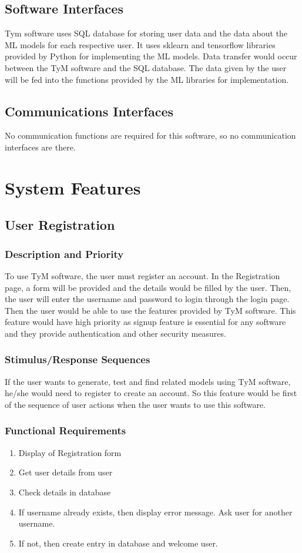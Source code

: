 \documentclass{scrreprt}
\begin{document}
\section{Software Interfaces}
Tym software uses SQL database for storing user data and the data about the ML models for each respective user. It uses sklearn and tensorflow libraries provided by Python for implementing the ML models. Data transfer would occur between the TyM software and the SQL database. The data given by the user will be fed into the functions provided by the ML libraries for implementation. 

\section{Communications Interfaces}
No communication functions are required for this software, so no communication interfaces are there.


\chapter{System Features}


\section{User Registration}

\subsection{Description and Priority}
To use TyM software, the user must register an account. In the Registration page, a form will be provided and the details would be filled by the user. Then, the user will enter the username and password to login through the login page. Then the user would be able to use the features provided by TyM software. This feature would have high priority as signup feature is essential for any software and they provide authentication and other security measures.

\subsection{Stimulus/Response Sequences}
If the user wants to generate, test and find related models using TyM software, he/she would need to register to create an account. So this feature would be first of the sequence of user actions when the user wants to use this software.  

\subsection{Functional Requirements}
\begin{enumerate}
\item Display of Registration form
\item Get user details from user
\item Check details in database
\item If username already exists, then display error message. Ask user for another username.
\item If not, then create entry in database and welcome user.
\end{enumerate}
\end{document}
